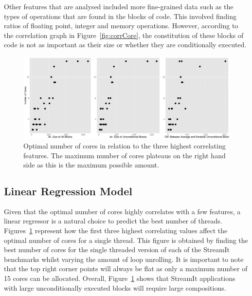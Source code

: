 Other features that are analysed included more fine-grained data such as the types of operations that are found in the blocks of code.
This involved finding ratios of floating point, integer and memory operations.
However, according to the correlation graph in Figure~\ref{fig:corrCore}, the constitution of these blocks of code is not as important as their size or whether they are conditionally executed.


\begin{figure}[t]
  \center
  \includegraphics[width=1\textwidth]{streamit-paper/graphics/lineargraphs.pdf}
  \caption{Optimal number of cores in relation to the three highest correlating features. The maximum number of cores plateaus on the right hand side as this is the maximum possible amount.}\label{fig:maxav}
\end{figure}
\subsection{Linear Regression Model}
Given that the optimal number of cores highly correlates with a few features, a linear regressor is a natural choice to predict the best number of threads.
Figures~\ref{fig:maxav} represent how the first three highest correlating values affect the optimal number of cores for a single thread.
This figure is obtained by finding the best number of cores for the single threaded version of each of the StreamIt benchmarks whilst varying the amount of loop unrolling.
It is important to note that the top right corner points will always be flat as only a maximum number of 15 cores can be allocated.
Overall, Figure~\ref{fig:maxav} shows that StreamIt applications with large unconditionally executed blocks will require large compositions.


